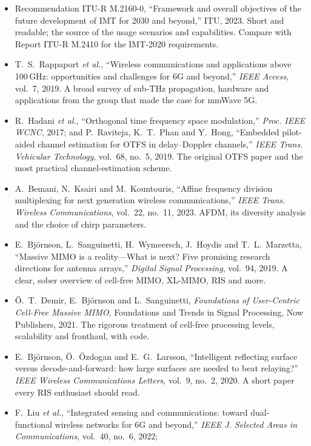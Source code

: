 \furtherreading
\begin{itemize}
\item Recommendation ITU-R M.2160-0, ``Framework and overall objectives of the future development of
IMT for 2030 and beyond,'' ITU, 2023. Short and readable; the source of the usage scenarios and
capabilities. Compare with Report ITU-R M.2410 for the IMT-2020 requirements.
\item T.~S.~Rappaport \emph{et al.}, ``Wireless communications and applications above 100\,GHz:
opportunities and challenges for 6G and beyond,'' \emph{IEEE Access}, vol.~7, 2019. A broad survey of
sub-THz propagation, hardware and applications from the group that made the case for mmWave 5G.
\item R.~Hadani \emph{et al.}, ``Orthogonal time frequency space modulation,'' \emph{Proc. IEEE WCNC},
2017; and P.~Raviteja, K.~T.~Phan and Y.~Hong, ``Embedded pilot-aided channel estimation for OTFS in
delay--Doppler channels,'' \emph{IEEE Trans. Vehicular Technology}, vol.~68, no.~5, 2019. The original
OTFS paper and the most practical channel-estimation scheme.
\item A.~Bemani, N.~Ksairi and M.~Kountouris, ``Affine frequency division multiplexing for next
generation wireless communications,'' \emph{IEEE Trans. Wireless Communications}, vol.~22, no.~11,
2023. AFDM, its diversity analysis and the choice of chirp parameters.
\item E.~Bj\"ornson, L.~Sanguinetti, H.~Wymeersch, J.~Hoydis and T.~L.~Marzetta, ``Massive MIMO is a
reality---What is next? Five promising research directions for antenna arrays,'' \emph{Digital Signal
Processing}, vol.~94, 2019. A clear, sober overview of cell-free MIMO, XL-MIMO, RIS and more.
\item \"O.~T.~Demir, E.~Bj\"ornson and L.~Sanguinetti, \emph{Foundations of User-Centric Cell-Free
Massive MIMO}, Foundations and Trends in Signal Processing, Now Publishers, 2021. The rigorous treatment
of cell-free processing levels, scalability and fronthaul, with code.
\item E.~Bj\"ornson, \"O.~\"Ozdogan and E.~G.~Larsson, ``Intelligent reflecting surface versus
decode-and-forward: how large surfaces are needed to beat relaying?'' \emph{IEEE Wireless
Communications Letters}, vol.~9, no.~2, 2020. A short paper every RIS enthusiast should read.
\item F.~Liu \emph{et al.}, ``Integrated sensing and communications: toward dual-functional wireless
networks for 6G and beyond,'' \emph{IEEE J. Selected Areas in Communications}, vol.~40, no.~6, 2022;

\end{itemize}
